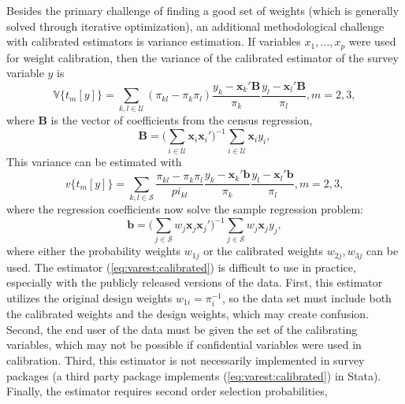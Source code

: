 Besides the primary challenge of finding a good set of weights
(which is generally solved through iterative optimization),
an additional methodological challenge with calibrated estimators
is variance estimation. If variables $x_1,\ldots,x_p$ were used
for weight calibration, then the variance of the calibrated
estimator of the survey variable $y$ is
\begin{equation}
    \mathbb{V}\bigl\{t_{m}[y]\bigr\} = \sum_{k,l \in \mathcal{U}}
        (\pi_{kl}-\pi_k \pi_l)
        \frac{y_k - \mathbf{x}_k ' \mathbf{B}}{\pi_k}
        \frac{y_l - \mathbf{x}_l ' \mathbf{B}}{\pi_l}, m=2,3,
    \label{eq:var:calibrated}
\end{equation}
where $\mathbf{B}$ is the vector of coefficients from the
census regression,
\begin{equation}
    \mathbf{B}
    = \bigl( \sum_{i \in \mathcal{U}} \mathbf{x}_i \mathbf{x}_i' )^{-1}
      \sum_{i \in \mathcal{U}} \mathbf{x}_i y_i
    \label{eq:census:regression},
\end{equation}
This variance can be estimated with
\begin{equation}
    v\bigl\{t_{m}[y]\bigr\} = \sum_{k,l \in \mathcal{S}}
        \frac{\pi_{kl}-\pi_k \pi_l}{pi_{kl}}
        \frac{y_k - \mathbf{x}_k ' \mathbf{b}}{\pi_k}
        \frac{y_l - \mathbf{x}_l ' \mathbf{b}}{\pi_l}, m=2,3,
    \label{eq:varest:calibrated}
\end{equation}
where the regression coefficients now solve the sample
regression problem:
\begin{equation}
    \mathbf{b}
    = \bigl( \sum_{j \in \mathcal{S}} w_j \mathbf{x}_j \mathbf{x}_j' )^{-1}
      \sum_{j \in \mathcal{S}} w_j \mathbf{x}_j y_j
    \label{eq:sample:regression},
\end{equation}
where either the probability weights $w_{1j}$ or the calibrated weights
$w_{2j}, w_{3j}$ can be used. The estimator (\ref{eq:varest:calibrated})
is difficult to use in practice, especially with the publicly released
versions of the data. First, this estimator utilizes the original design weights
$w_{1i}=\pi_i^{-1}$, so the data set must include both the calibrated weights
and the design weights, which may create confusion. Second, the end user
of the data must be given the set of the calibrating variables, which may
not be possible if confidential variables were used in calibration. Third,
this estimator is not necessarily implemented in survey packages
(a third party package  implements (\ref{eq:varest:calibrated})
in Stata). Finally, the estimator requires second order selection probabilities,
